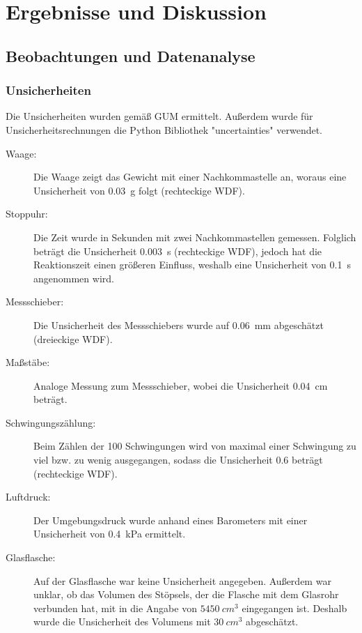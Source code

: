 \documentclass[
	a4paper,
	12pt,
	pagesize,
	ngerman
]{scrartcl}
\begin{document}
	\section{Ergebnisse und Diskussion}
	

	\subsection{Beobachtungen und Datenanalyse}
	\subsubsection{Unsicherheiten} %
	Die Unsicherheiten wurden gemäß GUM ermittelt. 
	Außerdem wurde für Unsicherheitsrechnungen die Python Bibliothek "uncertainties" verwendet.
	\begin{description}
		\item[Waage:] Die Waage zeigt das Gewicht mit einer Nachkommastelle an, woraus eine Unsicherheit von \SI{0,03}{g} folgt (rechteckige WDF).
		\item[Stoppuhr:] Die Zeit wurde in Sekunden mit zwei Nachkommastellen gemessen. Folglich beträgt die Unsicherheit \SI{0,003}{s} (rechteckige WDF), jedoch hat die Reaktionszeit einen größeren Einfluss, weshalb eine Unsicherheit von \SI{0,1}{s} angenommen wird.
		\item[Messschieber:] Die Unsicherheit des Messschiebers wurde auf \SI{0,06}{mm}  abgeschätzt (dreieckige WDF).
		\item[Maßstäbe:]  Analoge Messung zum Messschieber, wobei die Unsicherheit \SI{0,04}{cm} beträgt.
		\item[Schwingungszählung:] Beim Zählen der 100 Schwingungen wird von maximal einer Schwingung zu viel bzw. zu wenig ausgegangen, sodass die Unsicherheit \SI{0,6}{} beträgt (rechteckige WDF).
		\item[Luftdruck:] Der Umgebungsdruck wurde anhand eines Barometers mit einer Unsicherheit von \SI{0,4}{kPa} ermittelt.
		\item[Glasflasche:] Auf der Glasflasche war keine Unsicherheit angegeben. Außerdem war unklar, ob das Volumen des Stöpsels, der die Flasche mit dem Glasrohr verbunden hat, mit in die Angabe von $\SI{5450}{cm^3}$ eingegangen ist. Deshalb wurde die Unsicherheit des Volumens mit $\SI{30}{cm^3}$ abgeschätzt.
	\end{description}
	
\end{document}
